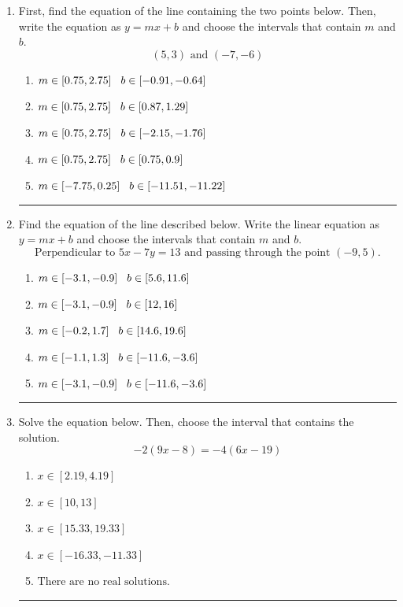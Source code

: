 \documentclass[14pt]{extbook}
\newcommand{\litem}[1]{\item#1\hspace*{-1cm}\rule{\textwidth}{0.4pt}}
\begin{document}
\begin{enumerate}
\litem{
First, find the equation of the line containing the two points below. Then, write the equation as $ y=mx+b $ and choose the intervals that contain $m$ and $b$.\[ (5, 3) \text{ and } (-7, -6) \]\begin{enumerate}[label=\Alph*.]
\item \( m \in [0.75, 2.75] \hspace*{3mm} b \in [-0.91, -0.64] \)
\item \( m \in [0.75, 2.75] \hspace*{3mm} b \in [0.87, 1.29] \)
\item \( m \in [0.75, 2.75] \hspace*{3mm} b \in [-2.15, -1.76] \)
\item \( m \in [0.75, 2.75] \hspace*{3mm} b \in [0.75, 0.9] \)
\item \( m \in [-7.75, 0.25] \hspace*{3mm} b \in [-11.51, -11.22] \)

\end{enumerate} }
\litem{
Find the equation of the line described below. Write the linear equation as $ y=mx+b $ and choose the intervals that contain $m$ and $b$.\[ \text{Perpendicular to } 5 x - 7 y = 13 \text{ and passing through the point } (-9, 5). \]\begin{enumerate}[label=\Alph*.]
\item \( m \in [-3.1, -0.9] \hspace*{3mm} b \in [5.6, 11.6] \)
\item \( m \in [-3.1, -0.9] \hspace*{3mm} b \in [12, 16] \)
\item \( m \in [-0.2, 1.7] \hspace*{3mm} b \in [14.6, 19.6] \)
\item \( m \in [-1.1, 1.3] \hspace*{3mm} b \in [-11.6, -3.6] \)
\item \( m \in [-3.1, -0.9] \hspace*{3mm} b \in [-11.6, -3.6] \)

\end{enumerate} }
\litem{
Solve the equation below. Then, choose the interval that contains the solution.\[ -2(9x -8) = -4(6x -19) \]\begin{enumerate}[label=\Alph*.]
\item \( x \in [2.19, 4.19] \)
\item \( x \in [10, 13] \)
\item \( x \in [15.33, 19.33] \)
\item \( x \in [-16.33, -11.33] \)
\item \( \text{There are no real solutions.} \)


\end{enumerate}}
\end{enumerate}
\end{document}
